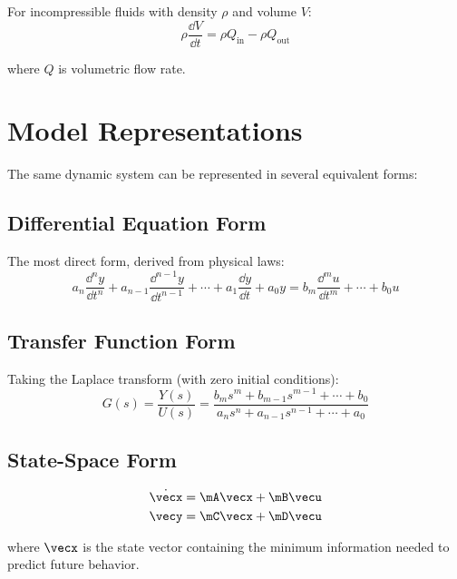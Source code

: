 For incompressible fluids with density $\rho$ and volume $V$:
\begin{equation}
\rho\frac{\dd V}{\dd t} = \rho Q_{\text{in}} - \rho Q_{\text{out}}
\end{equation}

where $Q$ is volumetric flow rate.

\chapter{Model Representations}
\label{ch:model_representations}

The same dynamic system can be represented in several equivalent forms:

\section{Differential Equation Form}

The most direct form, derived from physical laws:
\begin{equation}
a_n\frac{\dd^n y}{\dd t^n} + a_{n-1}\frac{\dd^{n-1} y}{\dd t^{n-1}} + \cdots + a_1\frac{\dd y}{\dd t} + a_0 y = b_m\frac{\dd^m u}{\dd t^m} + \cdots + b_0 u
\end{equation}

\section{Transfer Function Form}

Taking the Laplace transform (with zero initial conditions):
\begin{equation}
G(s) = \frac{Y(s)}{U(s)} = \frac{b_m s^m + b_{m-1}s^{m-1} + \cdots + b_0}{a_n s^n + a_{n-1}s^{n-1} + \cdots + a_0}
\end{equation}

\section{State-Space Form}

\begin{align}
\dot{\vecx} &= \mA\vecx + \mB\vecu \\
\vecy &= \mC\vecx + \mD\vecu
\end{align}

where $\vecx$ is the state vector containing the minimum information needed to predict future behavior.

